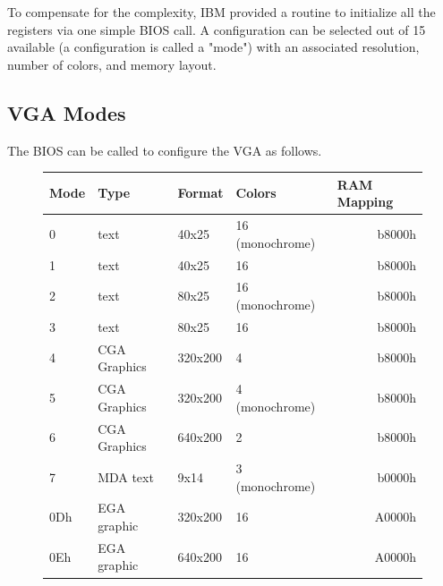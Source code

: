\documentclass[book.tex]{subfiles}
\begin{document}
\bigskip



To compensate for the complexity, IBM provided a routine to initialize all the registers via one simple BIOS call. A configuration can be selected out of 15 available (a configuration is called a "mode") with an associated resolution, number of colors, and memory layout.

\subsection{VGA Modes}

The BIOS can be called to configure the VGA as follows.

\begin{figure}[H]
\centering
\begin{table}[H]
\begin{tabularx}{\textwidth}[c]{llllr}
\hline
\textbf{Mode} & \textbf{Type} & \textbf{Format} & \textbf{Colors}          & \multicolumn{1}{l}{\textbf{RAM Mapping}} \\ \hline
0             & text          & 40x25           & 16 (monochrome) & b8000h                                \\ \hline
1             & text          & 40x25           & 16                       & b8000h                                \\ \hline
2             & text          & 80x25           & 16 (monochrome) & b8000h                                \\ \hline
3             & text          & 80x25           & 16                       & b8000h                                \\ \hline
4             & CGA Graphics  & 320x200         & 4                        & b8000h                                \\ \hline
5             & CGA Graphics  & 320x200         & 4 (monochrome)  & b8000h                                \\ \hline
6             & CGA Graphics  & 640x200         & 2                        & b8000h                                \\ \hline
7             & MDA text      & 9x14            & 3 (monochrome)  & b0000h                                \\ \hline
0Dh           & EGA graphic   & 320x200         & 16                       & A0000h                                \\ \hline
0Eh           & EGA graphic   & 640x200         & 16                       & A0000h                                \\ \hline

\end{tabularx}
\end{table}
\end{figure}
\end{document}
